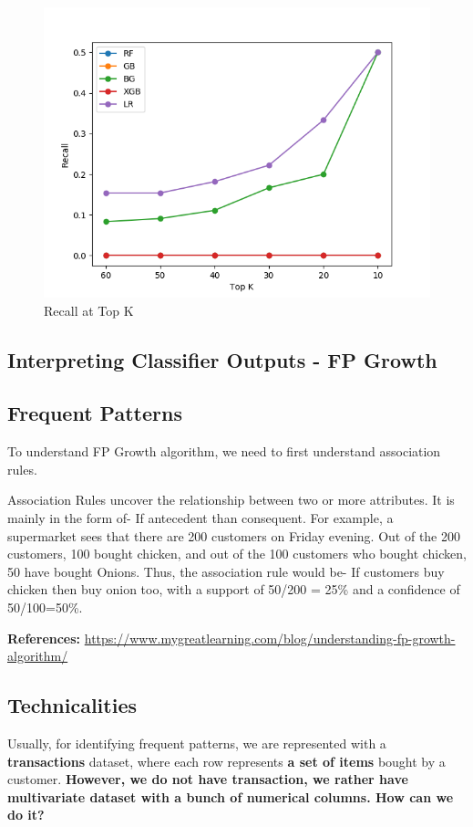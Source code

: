 \documentclass[11pt]{article}
\begin{document}
\begin{figure}[H]
\centering
\includegraphics[scale=0.5]{plots/toydata/recallstopK.png}
\caption{Recall at Top K}
\label{Fig:prectopk}
\end{figure}

\subsection{Interpreting Classifier Outputs - FP Growth}
\subsection*{Frequent Patterns}
To understand FP Growth algorithm, we need to first understand association rules.

Association Rules uncover the relationship between two or more attributes. It is mainly in the form of- If antecedent than consequent.  For example, a supermarket sees that there are 200 customers on Friday evening. Out of the 200 customers, 100 bought chicken, and out of the 100 customers who bought chicken, 50 have bought Onions. Thus, the association rule would be- If customers buy chicken then buy onion too, with a support of 50/200 = 25\% and a confidence of 50/100=50\%.

\textbf{References:} \url{https://www.mygreatlearning.com/blog/understanding-fp-growth-algorithm/}

\subsection{Technicalities}
\noindent Usually, for identifying frequent patterns, we are represented with a \textbf{transactions} dataset, where each row represents \textbf{a set of items} bought by a customer. \textbf{However, we do not have transaction, we rather have multivariate dataset with a bunch of numerical columns. How can we do it?}
\end{document}
